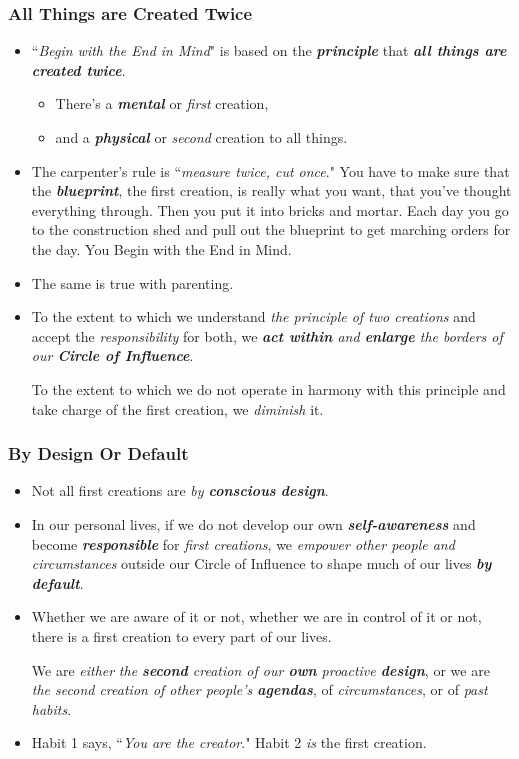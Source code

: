 \documentclass[11pt]{article}
\begin{document}
\subsubsection{All Things are Created Twice}
\begin{itemize}
\item ``\emph{Begin with the End in Mind}" is based on the \emph{\textbf{principle}} that \emph{\textbf{all things are created twice}}.
\begin{itemize}
\item  There's a \emph{\textbf{mental}} or \emph{first} creation,
\item  and a \emph{\textbf{physical}} or \emph{second} creation to all things.
\end{itemize}


\item The carpenter's rule is ``\emph{measure twice, cut once}." You have to make sure that the \emph{\textbf{blueprint}}, the first
creation, is really what you want, that you've thought everything through. Then you put it into bricks and mortar. Each day you go to the construction shed and pull out the blueprint to get marching orders for the day. You Begin with the End in Mind.

\item The same is true with parenting.

\item To the extent to which we understand \emph{the principle of two creations} and accept the \emph{responsibility} for both, we \emph{\textbf{act within} and \textbf{enlarge} the borders of our \textbf{Circle of Influence}}. 

To the extent to which we do not operate in harmony with this principle and take charge of the first creation, we \emph{diminish} it.
\end{itemize}
\subsubsection{By Design Or Default}
\begin{itemize}
\item Not all first creations are \emph{by \textbf{conscious} \textbf{design}}.

\item In our personal lives, if we do not develop our own \emph{\textbf{self-awareness}} and become \emph{\textbf{responsible}} for \emph{first creations}, we \emph{empower other people and circumstances} outside our Circle of Influence to shape much of our lives \textbf{\emph{by default}}. 

\item Whether we are aware of it or not, whether we are in control of it or not, there is a first creation to every part of our lives. 

We are \emph{either} \emph{the \textbf{second} creation of our \textbf{own} proactive \textbf{design}}, or we are \emph{the second creation of other people's \textbf{agendas}}, of \emph{circumstances}, or of \emph{past habits}.

\item Habit 1 says, ``\emph{You are the creator}." Habit 2 \emph{is} the first creation.
\end{itemize}
\end{document}
